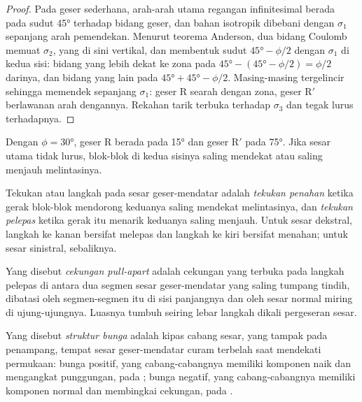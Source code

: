 \begin{proof}
Pada geser sederhana, arah-arah utama regangan infinitesimal berada pada sudut
\ang{45} terhadap bidang geser, dan bahan isotropik dibebani dengan
$\sigma_1$ sepanjang arah pemendekan. Menurut teorema Anderson, dua bidang Coulomb
memuat $\sigma_2$, yang di sini vertikal, dan membentuk sudut $\ang{45} - \phi/2$ dengan
$\sigma_1$ di kedua sisi: bidang yang lebih dekat ke zona pada $\ang{45} -
(\ang{45} - \phi/2) = \phi/2$ darinya, dan bidang yang lain pada $\ang{45} + \ang{45} -
\phi/2$. Masing-masing tergelincir sehingga memendek sepanjang $\sigma_1$: geser R searah dengan
zona, geser R$'$ berlawanan arah dengannya. Rekahan tarik terbuka terhadap $\sigma_3$ dan
tegak lurus terhadapnya.
\end{proof}

Dengan $\phi = \ang{30}$, geser R berada pada \ang{15} dan geser R$'$ pada
\ang{75}. Jika sesar utama tidak lurus, blok-blok di kedua sisinya
saling mendekat atau saling menjauh melintasinya.

\begin{definition}\label{def:b3:extension-strike-slip:bends}
Tekukan atau langkah pada sesar geser-mendatar adalah \emph{tekukan
penahan} ketika gerak blok-blok mendorong keduanya saling
mendekat melintasinya, dan \emph{tekukan pelepas} ketika gerak itu
menarik keduanya saling menjauh. Untuk sesar dekstral, langkah ke kanan bersifat melepas dan
langkah ke kiri bersifat menahan; untuk sesar sinistral, sebaliknya.
\end{definition}

\begin{definition}\label{def:b3:extension-strike-slip:pull-apart}
Yang disebut \emph{cekungan pull-apart} adalah cekungan yang terbuka pada
langkah pelepas di antara dua segmen sesar geser-mendatar yang saling tumpang tindih, dibatasi oleh
segmen-segmen itu di sisi panjangnya dan oleh sesar normal miring di ujung-ujungnya.
Luasnya tumbuh seiring lebar langkah dikali pergeseran sesar.
\end{definition}

\begin{definition}\label{def:b3:extension-strike-slip:flower}
Yang disebut \emph{struktur bunga} adalah kipas cabang sesar,
yang tampak pada penampang, tempat sesar geser-mendatar curam terbelah saat
mendekati permukaan: bunga positif, yang cabang-cabangnya memiliki komponen naik
dan mengangkat punggungan, pada ; bunga negatif, yang cabang-cabangnya memiliki
komponen normal dan membingkai cekungan, pada .
\end{definition}

